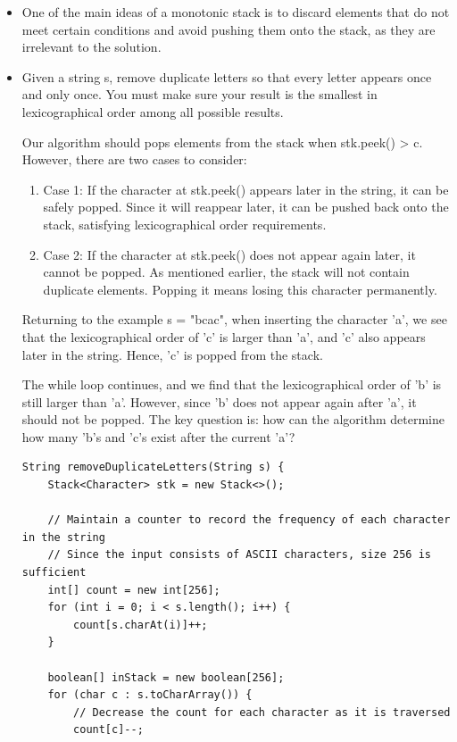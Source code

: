 \documentclass[a4paper,11pt,twoside]{book}
\begin{document}
\begin{itemize}
	\item One of the main ideas of a monotonic stack is to discard elements that do not meet certain conditions and avoid pushing them onto the stack, as they are irrelevant to the solution.
	
	
	\item Given a string s, remove duplicate letters so that every letter appears once and only once. You must make sure your result is 
	the smallest in lexicographical order
	among all possible results.
	
	
	Our algorithm should pops elements from the stack when stk.peek() > c. However, there are two cases to consider:
	
	\begin{enumerate}
		\item Case 1: If the character at stk.peek() appears later in the string, it can be safely popped. Since it will reappear later, it can be pushed back onto the stack, satisfying lexicographical order requirements.
		
		\item Case 2: If the character at stk.peek() does not appear again later, it cannot be popped. As mentioned earlier, the stack will not contain duplicate elements. Popping it means losing this character permanently.
	\end{enumerate}

	Returning to the example s = "bcac", when inserting the character 'a', we see that the lexicographical order of 'c' is larger than 'a', and 'c' also appears later in the string. Hence, 'c' is popped from the stack.
	
	The while loop continues, and we find that the lexicographical order of 'b' is still larger than 'a'. However, since 'b' does not appear again after 'a', it should not be popped. The key question is: how can the algorithm determine how many 'b's and 'c's exist after the current 'a'?
\begin{lstlisting}
String removeDuplicateLetters(String s) {
	Stack<Character> stk = new Stack<>();
	
	// Maintain a counter to record the frequency of each character in the string
	// Since the input consists of ASCII characters, size 256 is sufficient
	int[] count = new int[256];
	for (int i = 0; i < s.length(); i++) {
		count[s.charAt(i)]++;
	}
	
	boolean[] inStack = new boolean[256];
	for (char c : s.toCharArray()) {
		// Decrease the count for each character as it is traversed
		count[c]--;
		

\end{lstlisting}
\end{itemize}
\end{document}
